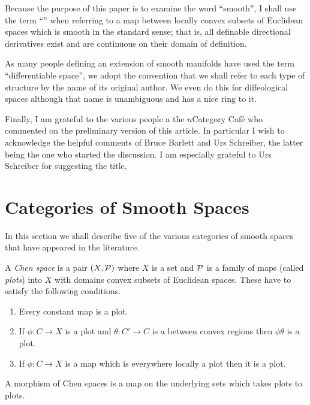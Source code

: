 \documentclass[%
12pt,%
arxiv,%
defaults
]{myclass}
\begin{document}
\medskip

Because the purpose of this paper is to examine the word ``smooth'', I shall use the term ``\cimap'' when referring to a map between locally convex subsets of Euclidean spaces which is smooth in the standard sense; that is, all definable directional derivatives exist and are continuous on their domain of definition.

As many people defining an extension of smooth manifolds have used the term ``differentiable space'', we adopt the convention that we shall refer to each type of structure by the name of its original author.
We even do this for diffeological spaces although that name is unambiguous and has a nice ring to it.

Finally, I am grateful to the various people a the \(n\)\enhyp{}Category Caf\'e who commented on the preliminary version of this article.
In particular I wish to acknowledge the helpful comments of Bruce Barlett and Urs Schreiber, the latter being the one who started the discussion.
I am especially grateful to Urs Schreiber for suggesting the title.

\section{Categories of Smooth Spaces}
\label{sec:smoothcats}

In this section we shall describe five of the various categories of smooth spaces that have appeared in the literature.

\begin{defn}
\label{def:chen}
 A \emph{Chen space} is a pair \((X, \mathcal{P})\) where \(X\) is a set and \(\mathcal{P}\) is a family of maps (called \emph{plots}) into \(X\) with domains convex subsets of Euclidean spaces.
 These have to satisfy the following conditions.
 \begin{enumerate}
 \item
  Every constant map is a plot.
 \item
  If \(\phi \colon C \to X\) is a plot and
   \(\theta \colon C' \to C\)
  is a \cimap between convex regions then \(\phi\theta\) is a plot.
 \item
  If \(\phi \colon C \to X\) is a map which is everywhere locally a plot then it is a plot.
 \end{enumerate}

 A morphism of Chen spaces is a map on the underlying sets which takes plots to plots.
\end{defn}
\end{document}
